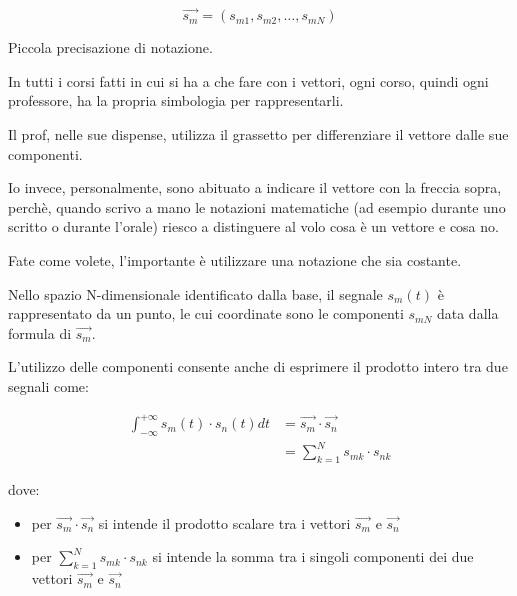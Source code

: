 {
    \Large 
    \begin{equation}
        \overrightarrow{s_{m}} 
        = 
        (s_{m1}, s_{m2}, \dots, s_{mN})
    \end{equation}
}

\begin{tcolorbox}
    Piccola precisazione di notazione. \newline 

    In tutti i corsi fatti in cui si ha a che fare con i vettori, 
    ogni corso, quindi ogni professore, ha la propria simbologia per rappresentarli. \newline 

    Il prof, nelle sue dispense, utilizza il grassetto per differenziare il vettore dalle sue componenti. \newline 

    Io invece, personalmente, sono abituato a indicare il vettore con la freccia sopra, 
    perchè, quando scrivo a mano le notazioni matematiche (ad esempio durante uno scritto o durante l'orale) 
    riesco a distinguere al volo cosa è un vettore e cosa no. \newline 
    
    Fate come volete, l'importante è utilizzare una notazione che sia costante. 
\end{tcolorbox}

Nello spazio N-dimensionale identificato dalla base, 
il segnale $s_{m} (t)$ è rappresentato da un punto, 
le cui coordinate sono le componenti $s_{mN}$ data dalla formula di $\overrightarrow{s_m}$. \newline 

L'utilizzo delle componenti consente anche di esprimere il prodotto intero tra due segnali come: 

{
    \Large 
    \begin{equation}
        \begin{split}
            \int_{- \infty}^{+ \infty}
            s_{m} (t) \cdot s_{n} (t) dt
            &= 
            \overrightarrow{s_m} \cdot \overrightarrow{s_n}
            \\
            &= 
            \sum_{k = 1}^{N}
            s_{mk} \cdot s_{nk}
        \end{split}
    \end{equation}
}

dove: 

\begin{itemize}
    \item per $\overrightarrow{s_m} \cdot \overrightarrow{s_n}$ si intende il prodotto scalare tra i vettori $\overrightarrow{s_m}$ e $\overrightarrow{s_n}$
    \item per $\sum_{k = 1}^{N} s_{mk} \cdot s_{nk}$ si intende la somma tra i singoli componenti dei due vettori $\overrightarrow{s_m}$ e $\overrightarrow{s_n}$
\end{itemize}

